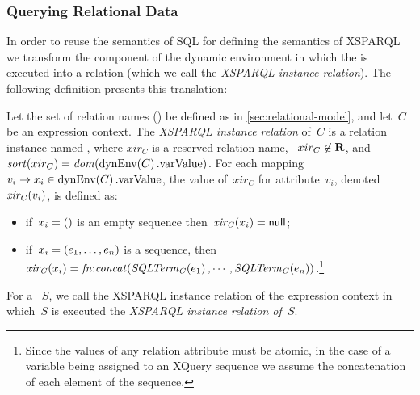 \subsubsection{Querying Relational Data}
\label{sec:extending-sql}


In order to reuse the semantics of \ac{SQL} for defining the semantics of XSPARQL  we transform the
 component of the dynamic environment in which the \SQLForClause is executed into a relation (which we
call the \emph{XSPARQL instance relation}).
%
The following definition presents this translation:
%
\begin{definition}
  \label{def:xml2sqlterm}
  Let the set of relation names (\AR) be defined as in \cref{sec:relational-model}, and let~$C$ be an expression
  context.
  The \emph{XSPARQL instance relation} of~$C$ is a relation instance named , where $xir_C$ is a reserved
  relation name, \ie~$xir_C \not\in \mathbf{R}$, and~$\mathit{sort}\!\left(xir_C\right) = \mathit{dom}\!\left(\mathit{{\textrm{dynEnv}}}\!\left(C\right).\textrm{varValue}\right)$.
  For each mapping~$v_{i} \rightarrow x_{i} \in \mathit{{\textrm{dynEnv}}}\!\left(C\right).\textrm{varValue}$, the value of~$xir_C$ for
  attribute~$v_i$, denoted~$\mathit{xir_C}\!\left(v_{i}\right)$, is defined as:
  \begin{itemize}[noitemsep]
  \item if~$x_{i} = \left(\right)$ is an empty sequence then~$\mathit{xir_C}\!\left(x_{i}\right) = {\sf null}$;
  \item if~$x_{i} = \left(e_{1}, \dotsc, e_{n}\right)$ is a sequence, then~$\mathit{xir_C}\!\left(x_{i}\right) =
    \mathit{fn{:}concat}\!\left(\mathit{SQLTerm_C}\!\left(e_{1}\right), \dotsb, \mathit{SQLTerm_C}\!\left(e_{n}\right)\right)$.\footnote{Since the values
      of any relation attribute must be atomic, in the case of a variable being assigned to an XQuery sequence we assume
      the concatenation of each element of the sequence.}
  \end{itemize}
   For a ~$S$, we call the XSPARQL instance relation of the expression context in which~$S$ is
  executed the \emph{XSPARQL instance relation of~$S$}.
\end{definition}
%

